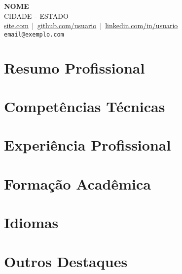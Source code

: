 \documentclass[a4paper,10pt]{article}
\begin{document}
\begin{center}
    {\LARGE \textbf{NOME}}\\[4pt]
    CIDADE – ESTADO \\[2pt]
    \href{}{site.com} \,|\, 
    \href{}{github.com/usuario} \,|\, 
    \href{}{linkedin.com/in/usuario}\\[6pt]
    \texttt{email@exemplo.com}
\end{center}

\vspace{0.4cm}

\section*{Resumo Profissional}

\section*{Competências Técnicas}

\section*{Experiência Profissional}

\section*{Formação Acadêmica}

\section*{Idiomas}

\section*{Outros Destaques}
\end{document}
